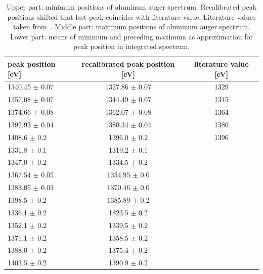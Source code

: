 \documentclass[a4paper,10pt]{scrartcl}
\begin{document}
\begin{table}
\begin{center}
\begin{tabular}{lcc}
\toprule
peak position  [eV]                    & recalibrated peak position [eV]        & literature value [eV]\\
\midrule
1340.45 $\pm$ 0.07                     & 1327.86 $\pm$ 0.07                     & 1329 \\
1357.08 $\pm$ 0.07                     & 1344.49 $\pm$ 0.07                     & 1345 \\
1374.66 $\pm$ 0.08                     & 1362.07 $\pm$ 0.08                     & 1364 \\
1392.93 $\pm$ 0.04                     & 1380.34 $\pm$ 0.04                     & 1380 \\
1408.6\phantom{0} $\pm$ 0.2\phantom{0} & 1396.0\phantom{0} $\pm$ 0.2\phantom{0} & 1396 \\
\midrule
1331.8\phantom{0} $\pm$ 0.1\phantom{0} & 1319.2\phantom{0} $\pm$ 0.1\phantom{0} & \\
1347.0\phantom{0} $\pm$ 0.2\phantom{0} & 1334.5\phantom{0} $\pm$ 0.2\phantom{0} & \\
1367.54 $\pm$ 0.05                     & 1354.95 $\pm$ 0.0                      & \\
1383.05 $\pm$ 0.03                     & 1370.46 $\pm$ 0.0                      & \\
1398.5\phantom{0} $\pm$ 0.2\phantom{0} & 1385.89 $\pm$ 0.2                      & \\
\midrule
1336.1\phantom{0} $\pm$ 0.2\phantom{0} & 1323.5\phantom{0} $\pm$ 0.2\phantom{0} & \\
1352.1\phantom{0} $\pm$ 0.2\phantom{0} & 1339.5\phantom{0} $\pm$ 0.2\phantom{0} & \\
1371.1\phantom{0} $\pm$ 0.2\phantom{0} & 1358.5\phantom{0} $\pm$ 0.2\phantom{0} & \\
1388.0\phantom{0} $\pm$ 0.2\phantom{0} & 1375.4\phantom{0} $\pm$ 0.2\phantom{0} & \\
1403.5\phantom{0} $\pm$ 0.2\phantom{0} & 1390.9\phantom{0} $\pm$ 0.2\phantom{0} & \\
\bottomrule
\end{tabular}
\end{center}
\par
\caption{Upper part: minimum positions of aluminum auger spectrum. Recalibrated peak positions shifted that last peak coincides with literature value. Literature values taken from~\cite{handbook}. Middle part: maximum positions of aluminum auger spectrum. Lower part: means of minimum and preceding maximum as approximation for peak position in integrated spectrum.\label{tab:augerpeaks}}
\end{table}
\end{document}
